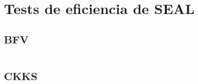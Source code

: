 \chapter{Tests de eficiencia de SEAL}
\label{appendix:benchmarks_seal}

\section{BFV}
\inputminted{}{apendices/benchmark_bfv_seal.txt}

\section{CKKS}

\inputminted{}{apendices/benchmark_ckks_seal.txt}
